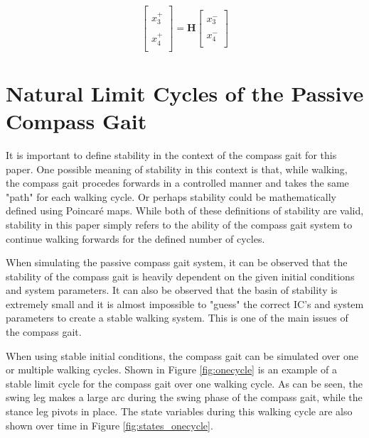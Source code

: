 \documentclass[smallextended]{./springer/svjour3}
\newcommand{\mb}[1]{\mathbf{#1}}
\begin{document}
\begin{equation}
\label{eq:trans2}
\begin{bmatrix}
\\x_3^+\\
\\x_4^+\\
\end{bmatrix}
 = 
\mb{H}
\begin{bmatrix}
\\x_3^-\\
\\x_4^-\\
\end{bmatrix}
\end{equation}




\section{Natural Limit Cycles of the Passive Compass Gait}

It is important to define stability in the context of the compass gait for this paper. One possible meaning of stability in this context is that, while walking, 
the compass gait procedes forwards in a controlled manner and takes the same "path" for each walking cycle. Or perhaps stability could be mathematically defined
using Poincaré maps. While both of these definitions of stability are valid, stability in this paper simply refers to the ability of the compass gait system to 
continue walking forwards for the defined number of cycles.

When simulating the passive compass gait system, it can be observed that the stability of the compass gait is heavily dependent on the
given initial conditions and system parameters. It can also be observed that the basin of stability is extremely small and it is almost impossible
to "guess" the correct IC's and system parameters to create a stable walking system. This is one of the main issues of the compass gait.

When using stable initial conditions, the compass gait can be simulated over one or multiple walking cycles. Shown in Figure \ref{fig:onecycle}
is an example of a stable limit cycle for the compass gait over one walking cycle. As can be seen, the swing leg makes a large arc during the swing phase of the 
compass gait, while the stance leg pivots in place. The state variables during this walking cycle are also shown over time in Figure \ref{fig:states_onecycle}.
\end{document}
